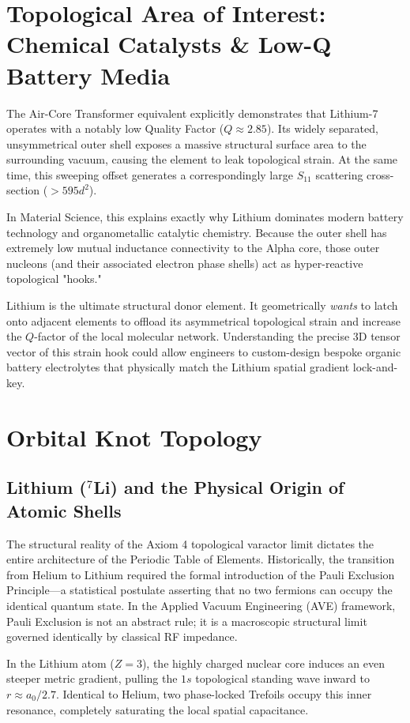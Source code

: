 \section{Topological Area of Interest: Chemical Catalysts \& Low-Q Battery Media}
The Air-Core Transformer equivalent explicitly demonstrates that Lithium-7 operates with a notably low Quality Factor ($Q \approx 2.85$). Its widely separated, unsymmetrical outer shell exposes a massive structural surface area to the surrounding vacuum, causing the element to leak topological strain. At the same time, this sweeping offset generates a correspondingly large $S_{11}$ scattering cross-section ($>595 d^2$).

In Material Science, this explains exactly why Lithium dominates modern battery technology and organometallic catalytic chemistry. Because the outer shell has extremely low mutual inductance connectivity to the Alpha core, those outer nucleons (and their associated electron phase shells) act as hyper-reactive topological "hooks." 

Lithium is the ultimate structural donor element. It geometrically \textit{wants} to latch onto adjacent elements to offload its asymmetrical topological strain and increase the $Q$-factor of the local molecular network. Understanding the precise 3D tensor vector of this strain hook could allow engineers to custom-design bespoke organic battery electrolytes that physically match the Lithium spatial gradient lock-and-key.


\section{Orbital Knot Topology}
\subsection{Lithium ($^7$Li) and the Physical Origin of Atomic Shells}

The structural reality of the Axiom 4 topological varactor limit dictates the entire architecture of the Periodic Table of Elements. Historically, the transition from Helium to Lithium required the formal introduction of the Pauli Exclusion Principle---a statistical postulate asserting that no two fermions can occupy the identical quantum state. In the Applied Vacuum Engineering (AVE) framework, Pauli Exclusion is not an abstract rule; it is a macroscopic structural limit governed identically by classical RF impedance.

In the Lithium atom ($Z=3$), the highly charged nuclear core induces an even steeper metric gradient, pulling the $1s$ topological standing wave inward to $r \approx a_0 / 2.7$. Identical to Helium, two phase-locked Trefoils occupy this inner resonance, completely saturating the local spatial capacitance.

